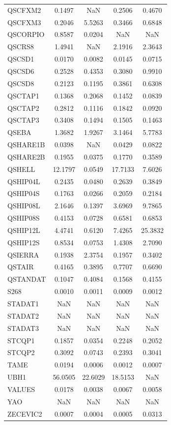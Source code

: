 \begin{longtable}{lcccc}
QSCFXM2  &   0.1497 &      NaN &   0.2506 &   0.4670 \\
QSCFXM3  &   0.2046 &   5.5263 &   0.3466 &   0.6848 \\
QSCORPIO &   0.8587 &   0.0204 &      NaN &      NaN \\
QSCRS8   &   1.4941 &      NaN &   2.1916 &   2.3643 \\
QSCSD1   &   0.0170 &   0.0082 &   0.0145 &   0.0715 \\
QSCSD6   &   0.2528 &   0.4353 &   0.3080 &   0.9910 \\
QSCSD8   &   0.2123 &   0.1195 &   0.3861 &   0.6308 \\
QSCTAP1  &   0.1368 &   0.2068 &   0.1452 &   0.0839 \\
QSCTAP2  &   0.2812 &   0.1116 &   0.1842 &   0.0920 \\
QSCTAP3  &   0.3408 &   0.1494 &   0.1505 &   0.1463 \\
QSEBA    &   1.3682 &   1.9267 &   3.1464 &   5.7783 \\
QSHARE1B &   0.0398 &      NaN &   0.0429 &   0.0822 \\
QSHARE2B &   0.1955 &   0.0375 &   0.1770 &   0.3589 \\
QSHELL   &  12.1797 &   0.0549 &  17.7133 &   7.6026 \\
QSHIP04L &   0.2435 &   0.0480 &   0.2639 &   0.3849 \\
QSHIP04S &   0.1763 &   0.0266 &   0.2059 &   0.2184 \\
QSHIP08L &   2.1646 &   0.1397 &   3.6969 &   9.7865 \\
QSHIP08S &   0.4153 &   0.0728 &   0.6581 &   0.6853 \\
QSHIP12L &   4.4741 &   0.6120 &   7.4265 &  25.3832 \\
QSHIP12S &   0.8534 &   0.0753 &   1.4308 &   2.7090 \\
QSIERRA  &   0.1938 &   2.3754 &   0.1957 &   0.3402 \\
QSTAIR   &   0.4165 &   0.3895 &   0.7707 &   0.6690 \\
QSTANDAT &   0.1047 &   0.4084 &   0.1568 &   0.4155 \\
S268     &   0.0010 &   0.0011 &   0.0009 &   0.0012 \\
STADAT1  &      NaN &      NaN &      NaN &      NaN \\
STADAT2  &      NaN &      NaN &      NaN &      NaN \\
STADAT3  &      NaN &      NaN &      NaN &      NaN \\
STCQP1   &   0.1857 &   0.0354 &   0.2248 &   0.2052 \\
STCQP2   &   0.3092 &   0.0743 &   0.2393 &   0.3041 \\
TAME     &   0.0194 &   0.0006 &   0.0012 &   0.0007 \\
UBH1     &  56.0505 &  22.6029 &  18.5153 &      NaN \\
VALUES   &   0.0178 &   0.0038 &   0.0067 &   0.0058 \\
YAO      &      NaN &      NaN &      NaN &      NaN \\
ZECEVIC2 &   0.0007 &   0.0004 &   0.0005 &   0.0313 \\
\end{longtable}
